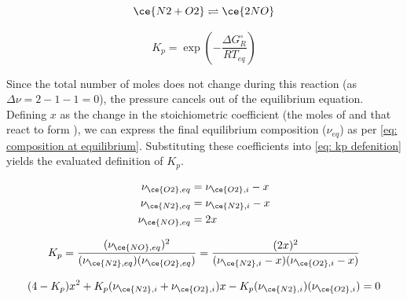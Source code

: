 \noindent
\begin{minipage}{0.5\textwidth}
\begin{equation}\label{eq: equilibrium reaction 3a}
    \ce{N2 + O2} \rightleftharpoons \ce{2 NO}
\end{equation}
\end{minipage}%
\begin{minipage}{0.5\textwidth}
\begin{equation}\label{eq: gibbs free energy 3a}
    K_p = \exp{\left( - \frac{\Delta G_{R} ^{\circ}}{R T_{eq}}\right)}
\end{equation}
\end{minipage}

Since the total number of moles does not change during this reaction (as $\Delta \nu = 2 -1 -1 = 0$), the pressure cancels out of the equilibrium equation. Defining $x$ as the change in the stoichiometric coefficient (the moles of  and  that react to form ), we can express the final equilibrium composition ($\nu_{eq}$) as per \autoref{eq: composition at equilibrium}. Substituting these coefficients into \autoref{eq: kp defenition} yields the evaluated definition of $K_p$. 
    
\noindent
\begin{minipage}{0.42\textwidth}
\begin{equation}\label{eq: composition at equilibrium}
\begin{aligned}
    \nu_{\ce{O2}, eq} &= \nu_{\ce{O2}, i} - x \\
    \nu_{\ce{N2}, eq} &= \nu_{\ce{N2}, i} - x \\
    \nu_{\ce{NO}, eq} &= 2x
\end{aligned}
\end{equation}
\end{minipage}%
\hfill
\begin{minipage}{0.55\textwidth}
\begin{equation}\label{eq: kp defenition}
    K_p = \frac{(\nu_{\ce{NO}, eq})^2}{(\nu_{\ce{N2}, eq})(\nu_{\ce{O2}, eq})} = \frac{(2x)^2}{(\nu_{\ce{N2},i}-x)(\nu_{\ce{O2},i}-x)}
\end{equation}
\end{minipage}

\begin{equation}\label{eq: 3a quadratic polynomial}
    (4-K_p)x^2 + K_p(\nu_{\ce{N2}, i} + \nu_{\ce{O2}, i})x - K_p (\nu_{\ce{N2}, i})(\nu_{\ce{O2}, i}) = 0
\end{equation}

